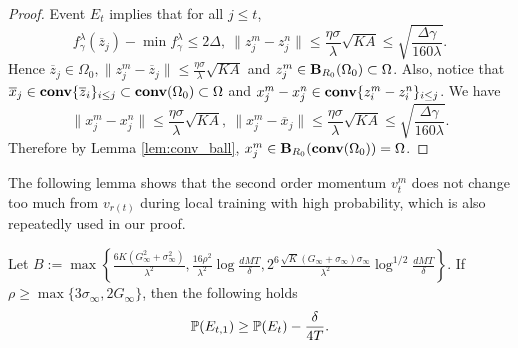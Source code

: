 \documentclass{article} %
\numberwithin{equation}{section}
\begin{document}
\begin{proof}
    Event $E_t$ implies that for all $j\leq t$,
    \begin{equation}
        f_\gamma^\lambda(\overline{z}_j)-\min f_\gamma^\lambda \leq 2\Delta,\ \|z_j^m-z_j^n\| \leq \frac{\eta\sigma}{\lambda}\sqrt{KA}\leq \sqrt{\frac{\Delta\gamma}{160\lambda}}.
    \end{equation}
    Hence $\overline{z}_j\in \Omega_0, \|z_j^m-\overline{z}_j\|\leq \frac{\eta\sigma}{\lambda}\sqrt{KA}$ and $z_j^m\in \mbox{\bf B}_{R_0}(\Omega_0)\subset \Omega$. 
    Also, notice that $\overline{x}_j\in \mbox{\bf conv}\{\overline{z}_i\}_{i\leq j}\subset \mbox{\bf conv}(\Omega_0)\subset\Omega$ and $x_j^m-x_j^n\in \mbox{\bf conv} \{z_i^m-z_i^n\}_{i\leq j}$. 
    We have 
    \begin{equation}
        \|x_j^m-x_j^n\| \leq \frac{\eta\sigma}{\lambda}\sqrt{KA},\ \|x_j^m-\overline{x}_j\| \leq \frac{\eta\sigma}{\lambda}\sqrt{KA}\leq \sqrt{\frac{\Delta\gamma}{160\lambda}}.
    \end{equation}
    Therefore by Lemma \ref{lem:conv_ball}, $x_j^m\in \mbox{\bf B}_{R_0}(\mbox{\bf conv}(\Omega_0)) = \Omega$.
\end{proof}

    The following lemma shows that the second order momentum $v_t^m$ does not change too much from $v_{r(t)}$ during local training with high probability, which is also repeatedly used in our proof.

\begin{lemma}\label{lem:H_ratio}
    Let $B:= \max\left\{\frac{6K(G_\infty^2+\sigma_\infty^2)}{\lambda^2}, \frac{16\rho^2}{\lambda^2}\log\frac{dMT}{\delta}, 2^6\frac{\sqrt{K}(G_\infty+\sigma_\infty)\sigma_\infty}{\lambda^2}\log^{1/2}\frac{dMT}{\delta}\right\}$. If $\rho\geq \max\{3\sigma_\infty, 2G_\infty\}$, then the following holds
    \begin{equation}
        \mathbb{P} (E_{t,1}) \geq \mathbb{P}(E_t) - \frac{\delta}{4T}.
    \end{equation}
\end{lemma}
\end{document}

